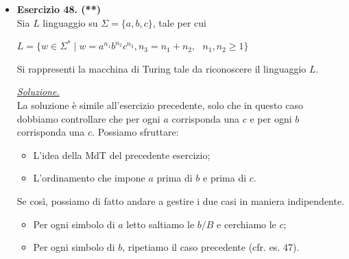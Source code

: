 \documentclass[a4paper,10pt]{article}
\makeatletter
\newcommand{\EsercitazioneNum}{07}
\newcommand{\Data}{23/10/2025}
\newcommand{\DocType}{Esercitazione} %
\newcommand{\FullTitle}{\DocType\ \EsercitazioneNum}
\newcommand{\Header}{
\noindent
  \small \textbf{Computabilità, Complessità e Logica - a.a. 2025/26} \hfill \textbf{\FullTitle} \\[0.2cm]
  \scriptsize Matteo Liotta, \texttt{matteo.liotta@studenti.units.it} \hfill \Data \\[0.2cm]
  \noindent\makebox[\linewidth]{\rule{\linewidth}{0.4pt}} \\[0.3cm]}
\newcommand{\NewPageHeader}{
  \vfill
  \noindent\makebox[\linewidth]{\rule{\linewidth}{0.4pt}}
  \newpage
  {\Header}
}
\makeatother
\begin{document}
{\begin{itemize}[label=, leftmargin=0pt]
\begin{osservazioni}
\begin{center}
\begin{tikzpicture}[shorten >=1pt, node distance=2cm, on grid, auto]
        
    \end{tikzpicture}
    \end{center}
    \end{osservazioni}
    \NewPageHeader

    
    \item \textbf{Esercizio 48. (**)}\\ Sia $L$ linguaggio su $\Sigma=\{a,b,c\}$, tale per cui 
    {\begin{center}
        $L = \{ w \in \Sigma^* \mid w = a^{n_1}b^{n_2}c^{n_3}, n_3 = n_1+n_2, \ \ \ n_1,n_2\geq1\}$
    \end{center}} 
    Si rappresenti la macchina di Turing tale da riconoscere il linguaggio $L$.\\[0.1cm]
    
    \begin{osservazioni}
    \underline{\textit{Soluzione.}}\\
    La soluzione è simile all'esercizio precedente, solo che in questo caso dobbiamo controllare che per ogni $a$ corrisponda una $c$ e per ogni $b$ corrisponda una $c$. Possiamo sfruttare:
    \begin{itemize}
        \item L'idea della MdT del precedente esercizio;
        \item L'ordinamento che impone $a$ prima di $b$ e prima di $c$.
    \end{itemize}
    Se così, possiamo di fatto andare a gestire i due casi in maniera indipendente.
    \begin{itemize}
        \item Per ogni simbolo di $a$ letto saltiamo le $b/B$ e cerchiamo le $c$;
        \item Per ogni simbolo di $b$, ripetiamo il caso precedente (cfr. es. 47).
    \end{itemize}

    
    \begin{center}
\end{center}
\end{osservazioni}
\end{itemize}}
\end{document}
